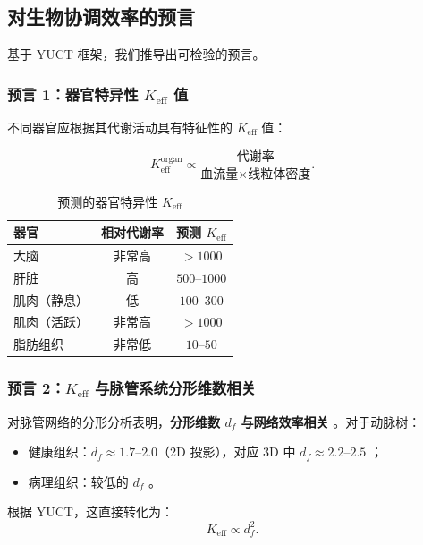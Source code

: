 \documentclass[12pt]{article}
\newcommand{\Keff}{K_{\mathrm{eff}}}
\begin{document}
	\subsection{对生物协调效率的预言}
	
	基于 YUCT 框架，我们推导出可检验的预言。
	
	\subsubsection{预言 1：器官特异性 \(\Keff\) 值}
	
	不同器官应根据其代谢活动具有特征性的 \(\Keff\) 值：
	
	\begin{equation}
		\Keff^{\text{organ}} \propto \frac{\text{代谢率}}{\text{血流量} \times \text{线粒体密度}}.
	\end{equation}
	
	\begin{table}[htbp]
		\centering
		\caption{预测的器官特异性 \(K_{\mathrm{eff}}\)}
		\label{tab:organ-keff}
		\begin{tabular}{lcc}
			\toprule
			\textbf{器官} & \textbf{相对代谢率} & \textbf{预测 \(K_{\mathrm{eff}}\)} \\
			\midrule
			大脑 & 非常高 & \(>1000\) \\
			肝脏 & 高 & \(500\)–\(1000\) \\
			肌肉（静息） & 低 & \(100\)–\(300\) \\
			肌肉（活跃） & 非常高 & \(>1000\) \\
			脂肪组织 & 非常低 & \(10\)–\(50\) \\
			\bottomrule
		\end{tabular}
	\end{table}
	
	\subsubsection{预言 2：\(\Keff\) 与脉管系统分形维数相关}
	
	对脉管网络的分形分析表明，\textbf{分形维数 \(d_f\) 与网络效率相关} \cite{Gould1993}。对于动脉树：
	\begin{itemize}
		\item 健康组织：\(d_f \approx 1.7\)–\(2.0\)（2D 投影），对应 3D 中 \(d_f \approx 2.2\)–\(2.5\) \cite{Cross1993}；
		\item 病理组织：较低的 \(d_f\) \cite{Gould1993}。
	\end{itemize}
	根据 YUCT，这直接转化为：
	\begin{equation}
		\Keff \propto d_f^{2}.
	\end{equation}
	
\end{document}

